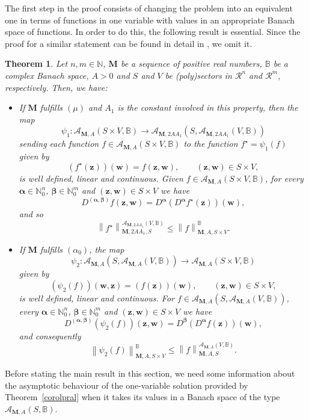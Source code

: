 \documentclass[11pt,a4paper,leqno]{article}
\theoremstyle{plain}
\newtheorem{theo}{Theorem}[section]
\theoremstyle{definition}
\def\N{\mathbb{N}}
\def\balpha{\boldsymbol{\alpha}}
\def\bbeta{\boldsymbol{\beta}}
\def\bM{\boldsymbol{M}}
\def\bw{\boldsymbol{w}}
\def\bz{\boldsymbol{z}}
\begin{document}
The first step in the proof consists of changing the problem into an equivalent one in terms of functions in one variable with values in an appropriate Banach space of functions. In order to do this, the following result is essential. Since the proof for a similar statement can be found in detail in \cite[Thm.\ 4.5]{hernandezsanz}, we omit it.

\begin{theo}\label{tcambio}
Let $n,m\in\N$, $\bM$ be a sequence of positive real numbers, $\mathbb{B}$ be a complex Banach space, $A>0$ and $S$ and $V$ be (poly)sectors in $\mathcal{R}^{n}$ and $\mathcal{R}^{m}$, respectively. Then, we have:
\begin{itemize}
\item[(i)] If $\bM$ fulfills $(\mu)$ and $A_1$ is the constant involved in this property, then the map
$$\psi_{1}:\mathcal{A}_{\bM,A}(S\times V,\mathbb{B})\longrightarrow\mathcal{A}_{\bM,2AA_{1}}\left(S,\mathcal{A}_{\bM,2AA_{1}}(V,\mathbb{B})\right)$$
sending each function $f\in \mathcal{A}_{\bM,A}(S\times V,\mathbb{B})$ to the function $f^{\star}=\psi_{1}(f)$ given by
$$\left(f^{\star}(\bz)\right)(\bw)=f(\bz,\bw),\qquad (\bz,\bw)\in S\times V,$$
is well defined, linear and continuous. Given $f\in\mathcal{A}_{\bM,A}(S\times V,\mathbb{B})$, for every $\balpha\in\N_{0}^{n}$, $\bbeta\in\N_{0}^{m}$ and $(\bz,\bw)\in S\times V$ we have
$$D^{(\balpha,\bbeta)}f(\bz,\bw)=D^{\balpha}\left(D^{\balpha}f^{\star}(\bz)\right)(\bw),$$
and so
$$\left\|f^{\star}\right\|_{\bM,2AA_1,S}^{\mathcal{A}_{\bM,2AA_{1}}(V,\mathbb{B})}\le \left\|f\right\|_{\bM,A,S\times V}^{\mathbb{B}}.$$
\item[(ii)] If $\bM$ fulfills $(\alpha_0)$, the map
$$\psi_{2}:\mathcal{A}_{\bM,A}\left(S,\mathcal{A}_{\bM,A}(V,\mathbb{B})\right) \longrightarrow \mathcal{A}_{\bM,A}(S\times V,\mathbb{B})$$
given by
$$\left(\psi_2(f)\right)(\bw,\bz)=\left(f(\bz)\right)(\bw),\qquad (\bz,\bw)\in S\times V,$$
is well defined, linear and continuous. For $f\in \mathcal{A}_{\bM,A}\left(S,\mathcal{A}_{\bM,A}(V,\mathbb{B})\right)$, every $\balpha\in\N_{0}^{n}$, $\bbeta\in\N_{0}^{m}$ and $(\bz,\bw)\in S\times V$ we have
\begin{equation}\label{igualDerivIsomor}
D^{(\balpha,\bbeta)}\left(\psi_{2}(f)\right)(\bz,\bw)=D^{\bbeta}\left(D^{\balpha}f(\bz)\right)(\bw),
\end{equation}
and consequently
$$\left\|\psi_{2}(f)\right\|_{\bM,A,S\times V}^{\mathbb{B}}\le\left\|f\right\|_{\bM,A,S}^{\mathcal{A}_{\bM,A}(V,\mathbb{B})}.$$
\end{itemize}
\end{theo}
Before stating the main result in this section, we need some information about the asymptotic behaviour of the one-variable solution provided by Theorem~\ref{corolpral} when it takes its values in a Banach space of the type $\mathcal{A}_{\bM,A}(S,\mathbb{B})$.\par
\end{document}
